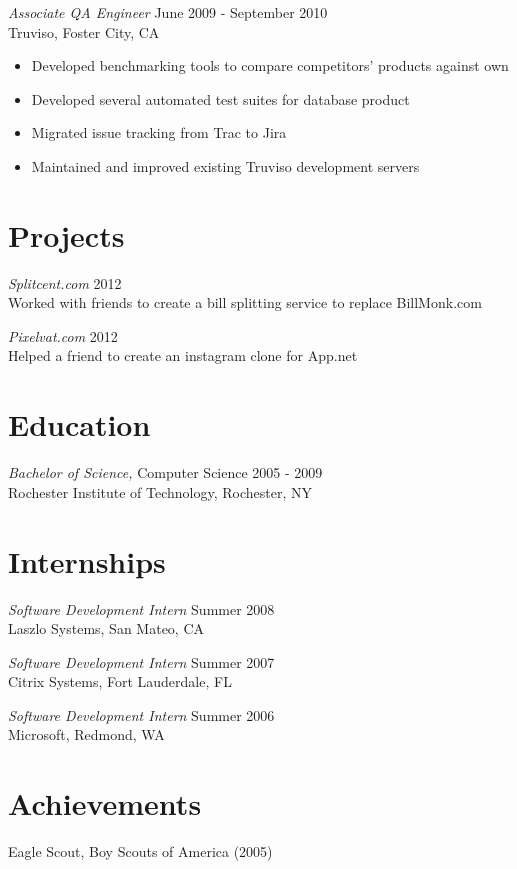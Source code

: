 \documentclass[line,margin]{res}
\begin{document}
\begin{resume}
                {\sl Associate QA Engineer} \hfill June 2009 - September 2010 \\
                Truviso, Foster City, CA
                \begin{itemize}  \itemsep -2pt %
                 \item Developed benchmarking tools to compare competitors' products against own
                 \item Developed several automated test suites for database product
                 \item Migrated issue tracking from Trac to Jira
                 \item Maintained and improved existing Truviso development servers
                \end{itemize}
                
\section{Projects}

                {\sl Splitcent.com} \hfill        2012 \\
                Worked with friends to create a bill splitting service to replace BillMonk.com
                
                {\sl Pixelvat.com} \hfill        2012 \\
                Helped a friend to create an instagram clone for App.net
                
\section{Education} {\sl Bachelor of Science,} Computer Science \hfill    2005 - 2009 \\
                Rochester Institute of Technology, Rochester, NY
                
\section{Internships}
                
                {\sl Software Development Intern} \hfill        Summer 2008 \\
                Laszlo Systems, San Mateo, CA
                
                {\sl Software Development Intern} \hfill        Summer 2007 \\
                Citrix Systems, Fort Lauderdale, FL
                
                {\sl Software Development Intern} \hfill          Summer 2006 \\
                Microsoft, Redmond, WA
           
\section{Achievements}             
            Eagle Scout, Boy Scouts of America (2005) \\
 
\end{resume}
\end{document}
